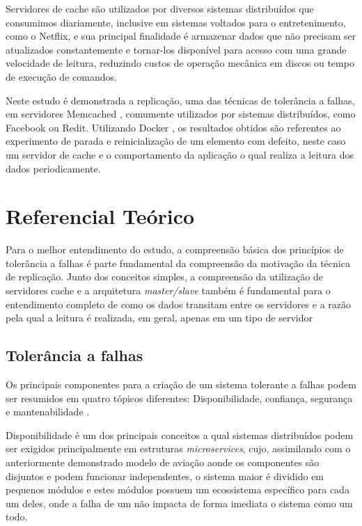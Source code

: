 \documentclass[conference]{IEEEtran}
\begin{document}
Servidores de cache são utilizados por diversos sistemas distribuídos que consumimos diariamente, inclusive em sistemas voltados para o entretenimento, como o Netflix, e sua principal finalidade é armazenar dados que não precisam ser atualizados constantemente e tornar-los disponível para acesso com uma grande velocidade de leitura, reduzindo custos de operação mecânica em discos ou tempo de execução de comandos.

Neste estudo é demonstrada a replicação, uma das técnicas de tolerância a falhas, em servidores Memcached \cite{memcached}, comumente utilizados por sistemas distribuídos, como Facebook ou Redit. Utilizando Docker \cite{docker}, os resultados obtidos são referentes ao experimento de parada e reinicialização de um elemento com defeito, neste caso um servidor de cache e o comportamento da aplicação o qual realiza a leitura dos dados periodicamente.

\section{Referencial Teórico}

Para o melhor entendimento do estudo, a compreensão básica dos princípios de tolerância a falhas é parte fundamental da compreensão da motivação da técnica de replicação. Junto dos conceitos simples, a compreensão da utilização de servidores cache e a arquitetura \textit{master/slave} também é fundamental para o entendimento completo de como os dados transitam entre os servidores e a razão pela qual a leitura é realizada, em geral, apenas em um tipo de servidor

\subsection{Tolerância a falhas}

Os principais componentes para a criação de um sistema tolerante a falhas podem ser resumidos em quatro tópicos diferentes: Disponibilidade, confiança, segurança e mantenabilidade \cite{Tanenbaum:2006:DSP:1202502}.

Disponibilidade é um dos principais conceitos a qual sistemas distribuídos podem ser exigidos principalmente em estruturas \textit{microservices}, cujo, assimilando com o anteriormente demonstrado modelo de aviação aonde os componentes são disjuntos e podem funcionar independentes, o sistema maior é dividido em pequenos módulos e estes módulos possuem um ecossistema específico para cada um deles, onde a falha de um não impacta de forma imediata o sistema como um todo. 
\end{document}

